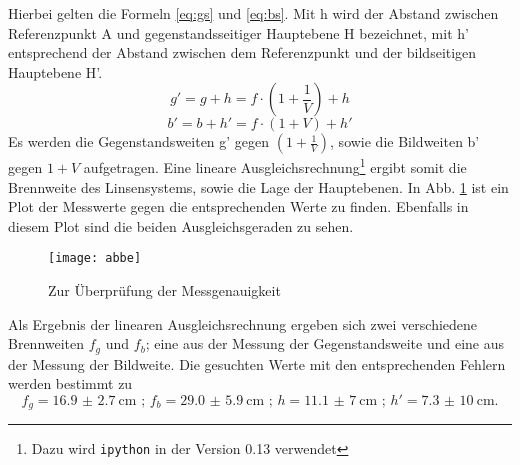 Hierbei gelten die Formeln \eqref{eq:gs} und \eqref{eq:bs}. Mit h wird der Abstand zwischen Referenzpunkt A und gegenstandsseitiger Hauptebene H bezeichnet, mit h' entsprechend der Abstand zwischen dem Referenzpunkt und der bildseitigen Hauptebene H'.
\begin{equation}
g' = g+h = f \cdot \left(1 + \frac{1}{V}\right) + h
\label{eq:gs}
\end{equation}
\begin{equation}
b' = b+h' = f \cdot \left(1 +V\right) + h'
\label{eq:bs}
\end{equation}
Es werden die Gegenstandsweiten g' gegen $\left(1 + \frac{1}{V}\right)$, sowie die Bildweiten b' gegen $1+ V$ aufgetragen. Eine lineare Ausgleichsrechnung\footnote{Dazu wird \texttt{ipython} in der Version 0.13 verwendet} ergibt somit die Brennweite des Linsensystems, sowie die Lage der Hauptebenen. 
In Abb. \ref{fig:abbe} ist ein Plot der Messwerte gegen die entsprechenden Werte zu finden. Ebenfalls in diesem Plot sind die beiden Ausgleichsgeraden zu sehen.
%
\begin{figure}[h!!]
\centering
\texttt{[image: abbe]}
\caption{Zur Überprüfung der Messgenauigkeit}
\label{fig:abbe}
\end{figure}
%

Als Ergebnis der linearen Ausgleichsrechnung ergeben sich zwei verschiedene Brennweiten $f_g$ und $f_b$; eine aus der Messung der Gegenstandsweite und eine aus der Messung der Bildweite. 
Die gesuchten Werte mit den entsprechenden Fehlern werden bestimmt zu
\begin{equation*}
f_g = \SI{16.9(27)}{\centi\metre} \text{ ; } f_b = \SI{29.0(59)}{\centi\metre} \text{ ; } h = \SI{11.1(70)}{\centi\metre} \text{ ; } h' = \SI{7.3(100)}{\centi\metre}.
\end{equation*}